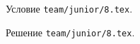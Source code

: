 \problem
Условие \texttt{team/junior/8.tex}.

\solution Решение \texttt{team/junior/8.tex}.
\endproblem
